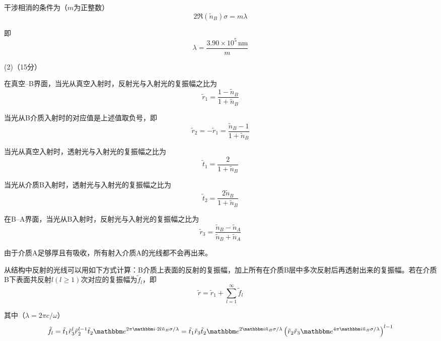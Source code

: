 \documentclass[10pt,a4paper,onecolumn,UTF8]{ctexart}
\begin{document}
	干涉相消的条件为（$m$为正整数）
	\begin{equation}
		2\Re(\tilde{n}_B)\sigma=m\lambda
	\end{equation}
	
	即
	\begin{equation}
		\lambda=\frac{3.90\times10^{5}\,\text{nm}}{m}
	\end{equation}
	
	
	(2)（15分）
	
	在真空--B界面，当光从真空入射时，反射光与入射光的复振幅之比为
	\begin{equation}\label{E4-01}
		\tilde r_1=\frac{1-\tilde n_B}{1+\tilde n_B}
	\end{equation}
	
	当光从B介质入射时的对应值是上述值取负号，即
	\begin{equation}\label{E4-02}
		\tilde{r}_2=-\tilde r_1=\frac{\tilde n_B-1}{1+\tilde n_B}
	\end{equation}
	
	当光从真空入射时，透射光与入射光的复振幅之比为
	\begin{equation}\label{E4-03}
		\tilde t_1=\frac{2}{1+\tilde n_B}
	\end{equation}
	
	当光从介质B入射时，透射光与入射光的复振幅之比为
	\begin{equation}\label{E4-04}
		\tilde t_2=\frac{2\tilde{n}_B}{1+\tilde n_B}
	\end{equation}
	
	在B--A界面，当光从B入射时，反射光与入射光的复振幅之比为
	\begin{equation}\label{E4-05}
		\tilde r_3=\frac{\tilde n_B-\tilde n_A}{\tilde n_B+\tilde n_A}
	\end{equation}
	
	由于介质A足够厚且有吸收，所有射入介质A的光线都不会再出来。
	
	从结构中反射的光线可以用如下方式计算：B介质上表面的反射的复振幅，加上所有在介质B层中多次反射后再透射出来的复振幅。若在介质B下表面共反射$l(l\geq1)$次对应的复振幅为$\tilde f_l$，即
	\begin{equation}\label{E4-06}
		\tilde{r}=\tilde{r}_1+\sum_{l=1}^{\infty}\tilde{f}_l
	\end{equation}
	
	其中（$\lambda=2\pi c/\omega$）
	\begin{equation}
		\tilde{f}_l=\tilde{t}_1\tilde{r}_3^l\tilde{r}_2^{l-1}\tilde{t}_2\ue^{2\pi\ui \cdot2l\tilde{n}_B\sigma/\lambda}=\tilde{t}_1\tilde{r}_3\tilde{t}_2\ue^{2\ui\tilde{n}_B\sigma/\lambda}\left(\tilde{r}_2\tilde{r}_3\ue^{4\pi\ui\tilde{n}_B\sigma/\lambda}\right)^{l-1}
	\end{equation}
	
\end{document}
